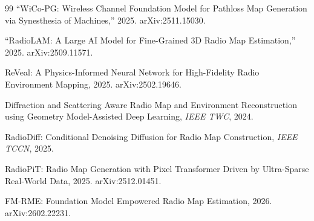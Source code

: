 \documentclass[11pt,a4paper]{article}
\begin{document}
\begin{thebibliography}{99}
``WiCo-PG: Wireless Channel Foundation Model for Pathloss Map Generation via Synesthesia of Machines,''
2025. arXiv:2511.15030.

``RadioLAM: A Large AI Model for Fine-Grained 3D Radio Map Estimation,''
2025. arXiv:2509.11571.

ReVeal: A Physics-Informed Neural Network for High-Fidelity Radio Environment Mapping,
2025. arXiv:2502.19646.

Diffraction and Scattering Aware Radio Map and Environment Reconstruction
using Geometry Model-Assisted Deep Learning, \textit{IEEE TWC}, 2024.

RadioDiff: Conditional Denoising Diffusion for Radio Map Construction,
\textit{IEEE TCCN}, 2025.

RadioPiT: Radio Map Generation with Pixel Transformer Driven by Ultra-Sparse
Real-World Data, 2025. arXiv:2512.01451.

FM-RME: Foundation Model Empowered Radio Map Estimation,
2026. arXiv:2602.22231.

\end{thebibliography}
\end{document}
